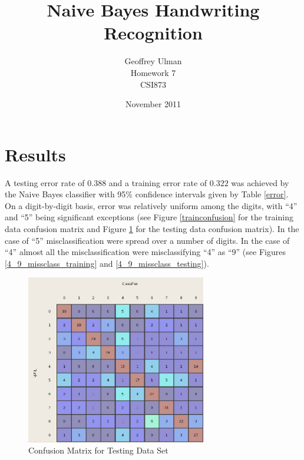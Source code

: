 \documentclass{article}
\begin{document}
\title{Naive Bayes Handwriting Recognition}
\author{Geoffrey Ulman\\
        Homework 7\\
        CSI873}
\date{November 2011}
\maketitle

\section{Results}\label{Results}

A testing error rate of \(0.388\) and a training error rate of \(0.322\) was achieved by the Naive Bayes classifier with 95\% confidence intervals given by Table \ref{error}. On a digit-by-digit basis, error was relatively uniform among the digits, with ``4'' and ``5'' being significant exceptions (see Figure \ref{trainconfusion} for the training data confusion matrix and Figure \ref{testconfusion} for the testing data confusion matrix). In the case of ``5'' misclassification were spread over a number of digits. In the case of ``4'' almost all the misclassification were misclassifying ``4'' as ``9'' (see Figures \ref{4_9_missclass_training} and \ref{4_9_missclass_testing}).

\begin{figure}
\centering
\includegraphics[width=0.7\textwidth]{ConfusionMatrixTesting.png}
\caption{Confusion Matrix for Testing Data Set}
\label{testconfusion}
\end{figure}
\end{document}
